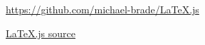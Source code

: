 \documentclass{article}
\begin{document}
\url{  https://github.com/michael-brade/LaTeX.js }

\href{ https://github.com/michael-brade/LaTeX.js }{LaTeX.js source}
\end{document}
